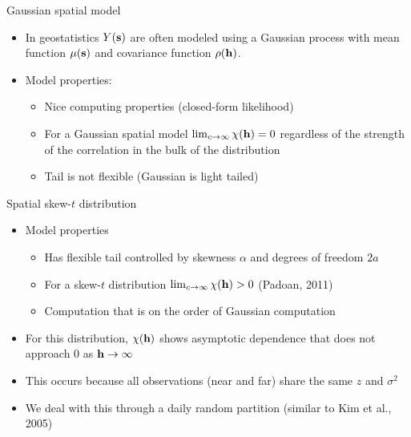 \documentclass{beamer}
\begin{document}
\begin{frame}{Gaussian spatial model}
  \begin{itemize} \setlength{\itemsep}{0.5em}
    \item In geostatistics $Y(\mbox{\bf s})$ are often modeled using a Gaussian process with mean function $\mu(\mbox{\bf s})$ and covariance function
$\rho(\mbox{\bf h})$.
    \item Model properties:
    \begin{itemize}
      \item Nice computing properties (closed-form likelihood)
    \item For a Gaussian spatial model $\lim_{c \rightarrow \infty} \chi(\mbox{\bf h}) = 0$ regardless of the strength of the correlation in the bulk of the distribution
    \item Tail is not flexible (Gaussian is light tailed)
    \end{itemize}
    \end{itemize}
\end{frame}

\begin{frame}{Spatial skew-$t$ distribution}
  \begin{itemize} \setlength{\itemsep}{0.5em}
      \item Model properties
    \begin{itemize}
    	\item Has flexible tail controlled by skewness $\alpha$ and degrees of freedom $2a$
    	\item For a skew-$t$ distribution $\lim_{c \rightarrow \infty} \chi(\mbox{\bf h}) > 0$ (Padoan, 2011)
    	\item Computation that is on the order of Gaussian computation
    \end{itemize}
    \item For this distribution, $\chi(\mbox{\bf h})$ shows asymptotic dependence that does not approach 0 as $\mbox{\bf h} \rightarrow \infty$
   \item This occurs because all observations (near and far) share the same $z$ and $\sigma^2$
    \item We deal with this through a daily random partition (similar to Kim et al., 2005)
  \end{itemize}
\end{frame}
\end{document}
